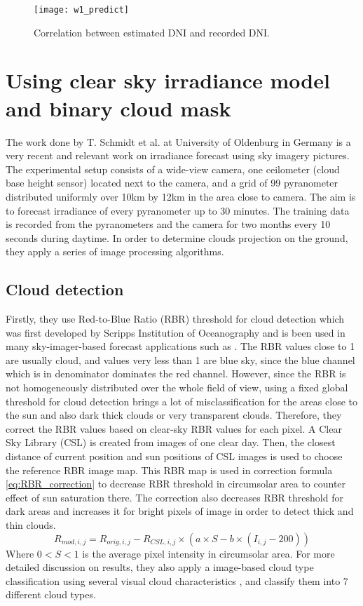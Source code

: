 \begin{figure}[h]
\caption{Correlation between estimated DNI and recorded DNI.}
\label{fig:w1_predict}
\texttt{[image: w1\_predict]}
\centering
\end{figure} 

\section{Using clear sky irradiance model and binary cloud mask}
The work done by T. Schmidt et al.\cite{tSchmidt_full} at University of Oldenburg in Germany is a very recent and relevant work on irradiance forecast using sky imagery pictures. The experimental setup consists of a wide-view camera, one ceilometer (cloud base height sensor) located next to the camera, and a grid of 99 pyranometer distributed uniformly over 10km by 12km in the area close to camera. The aim is to forecast irradiance of every pyranometer up to 30 minutes. The training data is recorded from the pyranometers and the camera for two months every 10 seconds during daytime.
In order to determine clouds projection on the ground, they apply a series of image processing algorithms. 
\subsection{Cloud detection}
Firstly, they use Red-to-Blue Ratio (RBR) threshold for cloud detection which was first developed by Scripps Institution of Oceanography \cite{RBR89, RBR98} and is been used in many sky-imager-based forecast applications such as \cite{cloud_detection_using_RBR}.  The RBR values close to 1 are usually cloud, and values very less than 1 are blue sky, since the blue channel which is in denominator dominates the red channel. However, since the RBR is not homogeneously distributed over the whole field of view, using a fixed global threshold for cloud detection brings a lot of misclassification for the areas close to the sun and also dark thick clouds or very transparent clouds. Therefore, they correct the RBR values based on clear-sky RBR values for each pixel. A Clear Sky Library (CSL) is created from images of one clear day. Then, the closest distance of current position and sun positions of CSL images is used to choose the reference RBR image map. This RBR map is used in correction formula \ref{eq:RBR_correction} to decrease RBR threshold in circumsolar area to counter effect of sun saturation there. The correction also decreases RBR threshold for dark areas and increases it for bright pixels of image in order to detect thick and thin clouds.
\begin{equation}
\label{eq:RBR_correction}
R_{mod,i,j} =  R_{orig,i,j} - R_{CSL,i,j} \times (a \times S - b \times (I_{i,j} - 200))
\end{equation}
Where $0<S<1$ is the average pixel intensity in circumsolar area. For more detailed discussion on results, they also apply a image-based cloud type classification using several visual cloud characteristics , and classify them into 7 different cloud types.

